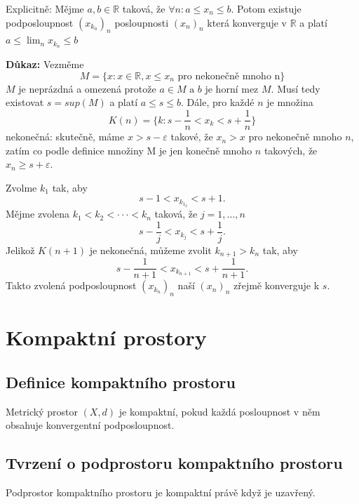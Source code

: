 \documentclass[10pt]{article}
\begin{document}
\noindent
\hspace{1.2mm}
Explicitně:
Mějme $a,b \in \mathbb{R}$ taková, že $\forall n: a \leq x_n \leq b$. Potom existuje podposloupnost
$(x_{k_n})_n$ posloupnosti $(x_n)_n$ která konverguje v $\mathbb{R}$ a platí
$a \leq \lim_n x_{k_n} \leq b$

\vspace{5mm}
\noindent
\textbf{Důkaz:} 
Vezměme \[M = \{x : x \in \mathbb{R}, x \leq x_n \text{ pro nekonečně mnoho n}\}\]
$M$ je neprázdná a omezená protože $a \in M \text{ a } b$ je horní mez $M$. Musí tedy existovat $s = sup(M)$ a platí 
$a \leq s \leq b$. Dále, pro každé $n$ je množina 
\[K(n) = \{k : s - \frac{1}{n} < x_k < s + \frac{1}{n}\}\]
nekonečná: skutečně, máme $x > s - \varepsilon$ takové, že $x_n > x$ pro nekonečně mnoho $n$, zatím co podle definice množiny M je jen
konečně mnoho $n$ takových, že $x_n \geq s + \varepsilon$. 

Zvolme $k_1$ tak, aby
\[s - 1 < x_{k_{1_2}} < s+1.\]
Mějme zvolena $k_1 < k_2 < \cdot \cdot \cdot < k_n$ taková, že $j = 1,...,n$
\[s - \frac{1}{j} < x_{k_j} < s + \frac{1}{j}.\]
Jelikož $K(n+1)$ je nekonečná, můžeme zvolit $k_{n+1} > k_n$ tak, aby
\[s - \frac{1}{n+1} < x_{k_{n+1}} < s + \frac{1}{n+1}.\]
Takto zvolená podposloupnost $(x_{k_n})_n$ naší $(x_n)_n$ zřejmě konverguje k $s$.

\section{Kompaktní prostory}
\subsection{Definice kompaktního prostoru}
\hspace{1.2mm}
\noindent
Metrický prostor $(X,d)$ je kompaktní, pokud každá posloupnost v něm obsahuje konvergentní podposloupnost.

\newpage
\subsection{Tvrzení o podprostoru kompaktního prostoru}
\hspace{1.2mm}
\noindent
Podprostor kompaktního prostoru je kompaktní právě když je uzavřený.
\end{document}
